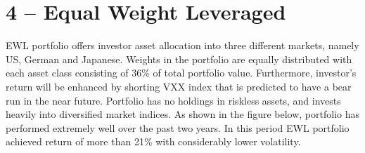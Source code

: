 \documentclass[11pt, parskip=full, DIV=14, headings=small, footsepline, footinclude=false, headsepline]{scrreprt}
\begin{document}
\newpage\section{4 -- Equal Weight Leveraged}
EWL portfolio offers investor asset allocation into three different markets, namely US, German and Japanese. Weights in the portfolio are equally distributed with each asset class consisting of 36\% of total portfolio value. Furthermore, investor’s return will be enhanced by shorting VXX index that is predicted to have a bear run in the near future. Portfolio has no holdings in riskless assets, and invests heavily into diversified market indices. As shown in the figure below, portfolio has performed extremely well over the past two years. In this period EWL portfolio achieved return of more than 21\% with considerably lower volatility. 

\begin{figure}[H]
\end{figure}
\end{document}
